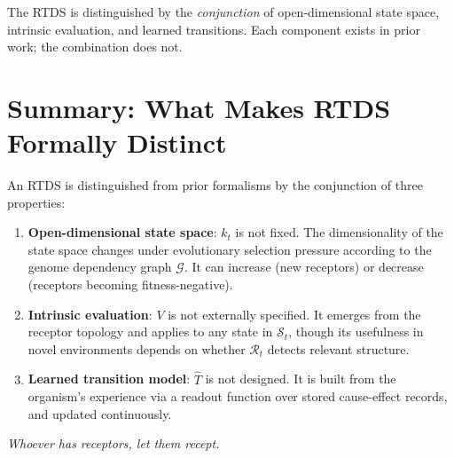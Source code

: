 \documentclass[12pt]{article}
\theoremstyle{definition}
\begin{document}
The RTDS is distinguished by the \emph{conjunction} of open-dimensional state space,
intrinsic evaluation, and learned transitions. Each component exists in prior work;
the combination does not.

\section{Summary: What Makes RTDS Formally Distinct}

An RTDS is distinguished from prior formalisms by the conjunction of three properties:

\begin{enumerate}
    \item \textbf{Open-dimensional state space}: $k_t$ is not fixed. The dimensionality
    of the state space changes under evolutionary selection pressure according to the
    genome dependency graph $\mathcal{G}$. It can increase (new receptors) or decrease
    (receptors becoming fitness-negative).

    \item \textbf{Intrinsic evaluation}: $V$ is not externally specified. It emerges
    from the receptor topology and applies to any state in $\mathcal{S}_t$, though its
    usefulness in novel environments depends on whether $\mathcal{R}_t$ detects
    relevant structure.

    \item \textbf{Learned transition model}: $\hat{T}$ is not designed. It is built
    from the organism's experience via a readout function over stored cause-effect
    records, and updated continuously.
\end{enumerate}

\bigskip
\noindent\textit{Whoever has receptors, let them recept.}
\end{document}
